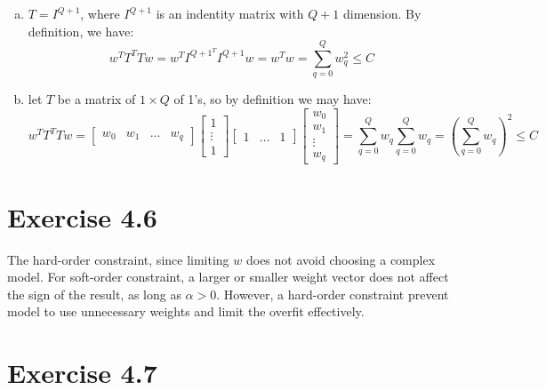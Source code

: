 \documentclass{article}
\def\math#1{$#1$}
\begin{document}
\begin{enumerate}[a)]
    \item \math{T = I^{Q + 1}}, where \math{I^{Q + 1}} is an indentity matrix with \math{Q + 1} dimension. By definition, we have: 
    \begin{equation}
        w^TT^TTw = w^TI^{{Q+1}^T}I^{Q+1}w = w^Tw = \sum^Q_{q = 0}w_q^2 \leq C
    \end{equation}
    \item let \math{T} be a matrix of \math{1 \times Q} of 1's, so by definition we may have:
    \begin{equation}
        w^TT^TTw = 
        \begin{bmatrix} w_0 & w_1 & \dots & w_q \end{bmatrix}
        \begin{bmatrix} 1 \\ \vdots \\ 1 \end{bmatrix}
        \begin{bmatrix} 1 & \dots & 1 \end{bmatrix}
        \begin{bmatrix} w_0 \\ w_1 \\ \vdots \\ w_q \end{bmatrix}
 = \sum^Q_{q = 0}w_q \sum^Q_{q = 0}w_q = (\sum^Q_{q = 0}w_q)^2 \leq C
    \end{equation}
\end{enumerate}

\section{Exercise 4.6}

The hard-order constraint, since limiting \math{w} does not avoid choosing a complex model. For soft-order constraint, a larger or smaller weight vector does not affect the sign of the result, as long as \math{\alpha > 0}. However, a hard-order constraint prevent model to use unnecessary weights and limit the overfit effectively. 

\section{Exercise 4.7}
\end{document}
